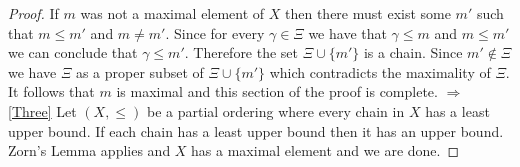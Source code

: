 \documentclass[12pt,leqno]{amsart}
\begin{document}
\begin{proof}
\newline
\newline
\indent If $m$ was not a maximal element of $X$ then there must exist some $m'$ such that $m \leq m'$ and $m \not= m'$.  Since for every $\gamma \in \Xi $ we have that $\gamma \leq m$ and $m \leq m'$ we can conclude that $\gamma \leq m'$.  Therefore the set $\Xi \cup \{m'\}$ is a chain.  Since $m' \not\in \Xi$ we have $\Xi$ as a proper subset of $\Xi \cup \{m'\}$ which contradicts the maximality of $\Xi$.
\newline
\newline
\indent It follows that $m$ is maximal and this section of the proof is complete.
\newline
{} $\Rightarrow$ \eqref{Three}
\newline
Let $(X, \leq)$ be a partial ordering where every chain in $X$ has a least upper bound.  If each chain has a least upper bound then it has an upper bound.  Zorn's Lemma applies and $X$ has a maximal element and we are done.

\end{proof}
\end{document}
